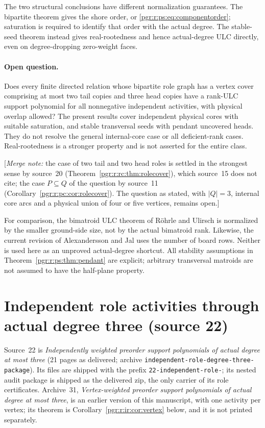 \documentclass[11pt]{article}
\numberwithin{equation}{section}
\theoremstyle{definition}\newtheorem{definition}[theorem]{Definition}\newtheorem{remark}[theorem]{Remark}
\newcommand{\mnote}[1]{[\textit{Merge note:} #1]}
\begin{document}
The two structural conclusions have different normalization guarantees. The bipartite theorem gives the shore order, or \eqref{pgr:r:ps:eq:componentorder}; saturation is required to identify that order with the actual degree. The stable-seed theorem instead gives real-rootedness and hence actual-degree ULC directly, even on degree-dropping zero-weight faces.

\paragraph{Open question.}
Does every finite directed relation whose bipartite role graph has a vertex cover comprising at most two tail copies and three head copies have a rank-ULC support polynomial for all nonnegative independent activities, with physical overlap allowed? The present results cover independent physical cores with suitable saturation, and stable transversal seeds with pendant uncovered heads. They do not resolve the general internal-core case or all deficient-rank cases. Real-rootedness is a stronger property and is not asserted for the entire class.

\mnote{the case of two tail and two head roles is settled in the
strongest sense by source~20 (Theorem~\ref{pgr:r:rc:thm:rolecover}), which
source~15 does not cite; the case $P\subseteq Q$ of the question by
source~11 (Corollary~\ref{pgr:r:pc:cor:rolecover}). The question as stated,
with $|Q|=3$, internal core arcs and a physical union of four or five
vertices, remains open.}


For comparison, the bimatroid ULC theorem of R\"ohrle and Ulirsch \cite[Theorem A]{RU} is normalized by the smaller ground-side size, not by the actual bimatroid rank. Likewise, the current revision of Alexandersson and Jal \cite[Corollary 4.1]{AJ} uses the number of board rows. Neither is used here as an unproved actual-degree shortcut. All stability assumptions in Theorem~\ref{pgr:r:ps:thm:pendant} are explicit; arbitrary transversal matroids are not assumed to have the half-plane property.


\section{Independent role activities through actual degree three (source 22)}\label{pgr:r:ir:sec}

Source~22 is \emph{Independently weighted preorder support polynomials of
actual degree at most three} (21 pages as delivered; archive
\texttt{independent-role-degree-three-package}). Its files are shipped with
the prefix \texttt{22-independent-role-}; its nested audit package is
shipped as the delivered zip, the only carrier of its role certificates.
Archive~31, \emph{Vertex-weighted preorder support polynomials of actual
degree at most three}, is an earlier version of this manuscript, with one
activity per vertex; its theorem is Corollary~\ref{pgr:r:ir:cor:vertex}
below, and it is not printed separately.
\end{document}
